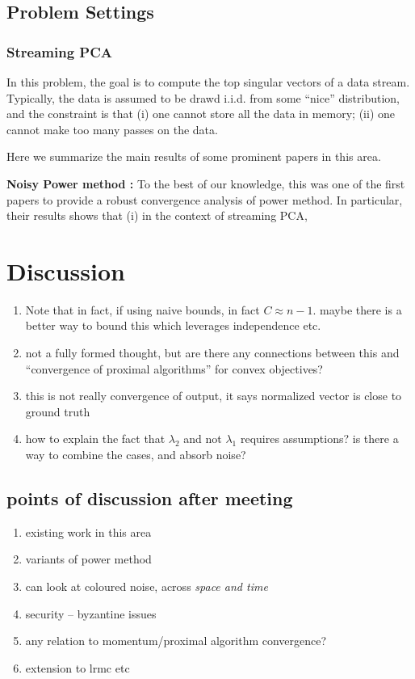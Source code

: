 \documentclass[10pt]{article}
\begin{document}
\subsection{Problem Settings}
\subsubsection{Streaming PCA}
In this problem, the goal is to compute the top singular vectors of a data stream. Typically, the data is assumed to be drawd i.i.d. from some ``nice'' distribution, and the constraint is that (i) one cannot store all the data in memory; (ii) one cannot make too many passes on the data.

Here we summarize the main results of some prominent papers in this area. 

{\bf Noisy Power method \cite{noisy_pm}:} To the best of our knowledge, this was one of the first papers to provide a robust convergence analysis of power method. In particular, their results shows that (i) in the context of streaming PCA, 

\color{blue}
\section{Discussion}
\begin{enumerate}
\item Note that in fact, if using naive bounds, in fact $C \approx n - 1$. maybe there is a better way to bound this which leverages independence etc. 
\item not a fully formed thought, but are there any connections between this and ``convergence of proximal algorithms'' for convex objectives?
\item this is not really convergence of output, it says normalized vector is close to ground truth
\item how to explain the fact that $\lambda_2$ and not $\lambda_1$ requires assumptions? is there a way to combine the cases, and absorb noise?
\end{enumerate}

\subsection{points of discussion after meeting}

\begin{enumerate}
\item existing work in this area
\item variants of power method
\item can look at coloured noise, across \em{space and time}
\item security -- byzantine issues
\item any relation to momentum/proximal algorithm convergence?
\item extension to lrmc etc
\end{enumerate}
\end{document}
